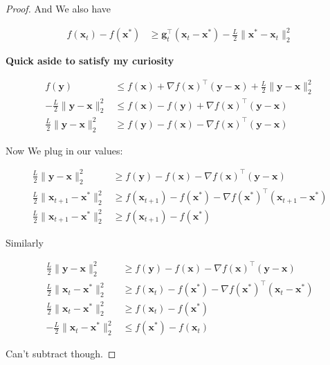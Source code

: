 \documentclass{article}
\begin{document}
\begin{proof}
	And We also have
	
	\begin{align}
		f(\mathbf{x}_t) - f(\mathbf{x}^*)   &\ge  \mathbf{g}_t^\top(\mathbf{x}_t - \mathbf{x}^*) - \frac{L}{2}\|\mathbf{x}^* - \mathbf{x}_t\|^2_2 
	\end{align}
	
	
	\textbf{Quick aside to satisfy my curiosity}
	
	\begin{align}
		f(\mathbf{y}) &\le f(\mathbf{x}) + \nabla f(\mathbf{x})^\top(\mathbf{y}-\mathbf{x}) + \frac{L}{2}\|\mathbf{y} - \mathbf{x}\|^2_2\\
		-\frac{L}{2}\|\mathbf{y} - \mathbf{x}\|^2_2 &\le f(\mathbf{x}) - f(\mathbf{y}) + \nabla f(\mathbf{x})^\top(\mathbf{y}-\mathbf{x})\\
		\frac{L}{2}\|\mathbf{y} - \mathbf{x}\|^2_2 &\ge f(\mathbf{y}) - f(\mathbf{x}) - \nabla f(\mathbf{x})^\top(\mathbf{y}-\mathbf{x})
	\end{align}
	
	Now We plug in our values:
	
	\begin{align}
		\frac{L}{2}\|\mathbf{y} - \mathbf{x}\|^2_2 &\ge f(\mathbf{y}) - f(\mathbf{x}) - \nabla f(\mathbf{x})^\top(\mathbf{y}-\mathbf{x})\\
		\frac{L}{2}\|\mathbf{x}_{t+1} - \mathbf{x}^*\|^2_2 &\ge f(\mathbf{x}_{t+1}) - f(\mathbf{x}^*) - \nabla f(\mathbf{x}^*)^\top(\mathbf{x}_{t+1}-\mathbf{x}^*)\\
		\frac{L}{2}\|\mathbf{x}_{t+1} - \mathbf{x}^*\|^2_2 &\ge f(\mathbf{x}_{t+1}) - f(\mathbf{x}^*) 
	\end{align}
	
	Similarly
	
	\begin{align}
		\frac{L}{2}\|\mathbf{y} - \mathbf{x}\|^2_2 &\ge f(\mathbf{y}) - f(\mathbf{x}) - \nabla f(\mathbf{x})^\top(\mathbf{y}-\mathbf{x})\\
		\frac{L}{2}\|\mathbf{x}_{t} - \mathbf{x}^*\|^2_2 &\ge f(\mathbf{x}_{t}) - f(\mathbf{x}^*) - \nabla f(\mathbf{x}^*)^\top(\mathbf{x}_{t}-\mathbf{x}^*)\\
		\frac{L}{2}\|\mathbf{x}_{t} - \mathbf{x}^*\|^2_2 &\ge f(\mathbf{x}_{t}) - f(\mathbf{x}^*) \\
		-\frac{L}{2}\|\mathbf{x}_{t} - \mathbf{x}^*\|^2_2 &\le f(\mathbf{x}^*) -  f(\mathbf{x}_{t})
	\end{align}
	
	Can't subtract though. 
	

\end{proof}
\end{document}
